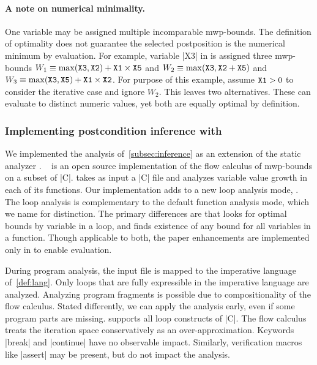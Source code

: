 \paragraph*{A note on numerical minimality.}
One variable may be assigned multiple incomparable mwp-bounds.
The definition of optimality does not guarantee the selected postposition is the numerical minimum by evaluation.
For example, variable \pr|X3| in \exname is assigned three mwp-bounds
\(W_1 \equiv \max(\prm{X3},\prm{X2})+\prm{X1} \times \prm{X5} \) and
\(W_2 \equiv \max(\prm{X3},\prm{X2}+\prm{X5}) \) and
\(W_3 \equiv \max(\prm{X3},\prm{X5})+\prm{X1} \times \prm{X2} \).
For purpose of this example, assume \(\prm{X1}>0\) to consider the iterative case and ignore \(W_2\).
This leaves two alternatives.
These can evaluate to distinct numeric values, yet both are equally optimal by definition.

\subsubsection{Implementing postcondition inference with \impl}
\label{subsec:implementation}

We implemented the analysis of~\autoref{subsec:inference} as an extension of the static analyzer .
~\cite{aubert2023b} is an open source implementation of the flow calculus of mwp-bounds on a subset of \pr|C|.
 takes as input a \pr|C| file and analyzes variable value growth in each of its functions.
Our implementation adds to  a new loop analysis mode, \impl.
The loop analysis is complementary to the default function analysis mode, which we name \impf for distinction.
The primary differences are that \impl looks for {optimal} bounds by variable in a {loop},
and \impf finds existence of {any} bound for all variables in a {function}.
Though applicable to both, the paper enhancements are implemented only in \impl to enable evaluation.

During program analysis, the input file is mapped to the imperative language of~\autoref{def:lang}.
Only loops that are fully expressible in the imperative language are analyzed.
Analyzing program fragments is possible due to compositionality of the flow calculus.
Stated differently, we can apply the analysis early, even if some program parts are missing.
 supports all loop constructs of \pr|C|.
The flow calculus treats the iteration space conservatively as an over-approximation.
Keywords \pr|break| and \pr|continue| have no observable impact.
Similarly, verification macros like \pr|assert| may be present, but do not impact the analysis.

